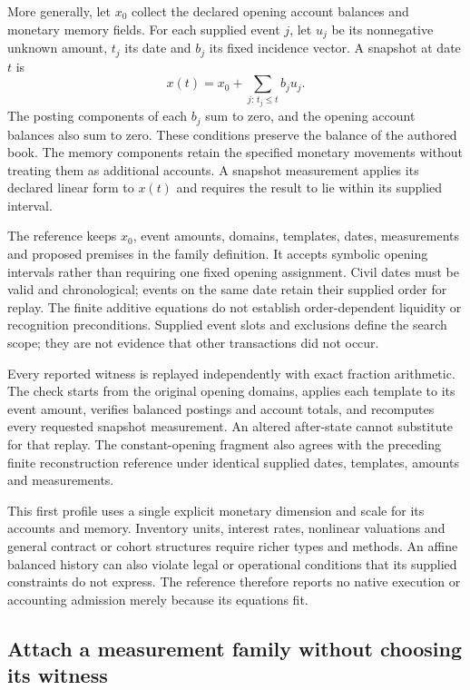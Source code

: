 More generally, let \(x_0\) collect the declared opening account balances
and monetary memory fields. For each supplied event \(j\), let \(u_j\)
be its nonnegative unknown amount, \(t_j\) its date and \(b_j\) its fixed
incidence vector. A snapshot at date \(t\) is
\begin{equation}
\label{eq:conditional-history-affine-state}
 x(t)=x_0+\sum_{j:\,t_j\leq t}b_j u_j.
\end{equation}
The posting components of each \(b_j\) sum to zero, and the opening account
balances also sum to zero. These conditions preserve the balance of the
authored book. The memory components retain the specified monetary movements
without treating them as additional accounts. A snapshot measurement applies
its declared linear form to \(x(t)\) and requires the result to lie within
its supplied interval.

The reference  keeps \(x_0\), event
amounts, domains, templates, dates, measurements and proposed premises in the
family definition. It accepts symbolic opening intervals rather than requiring
one fixed opening assignment. Civil dates must be valid and chronological;
events on the same date retain their supplied order for replay. The finite
additive equations do not establish order-dependent liquidity or recognition
preconditions. Supplied event slots and exclusions define the search scope;
they are not evidence that other transactions did not occur.

Every reported witness is replayed independently with exact fraction arithmetic.
The check starts from the original opening domains, applies each template to
its event amount, verifies balanced postings and account totals, and recomputes
every requested snapshot measurement. An altered after-state cannot substitute
for that replay. The constant-opening fragment also agrees with the preceding
finite reconstruction reference under identical supplied dates, templates,
amounts and measurements.

This first profile uses a single explicit monetary dimension and scale for its
accounts and memory. Inventory units, interest rates, nonlinear valuations and
general contract or cohort structures require richer types and methods. An
affine balanced history can also violate legal or operational conditions that
its supplied constraints do not express. The reference therefore reports no
native execution or accounting admission merely because its equations fit.

\subsection{Attach a measurement family without choosing its witness}

